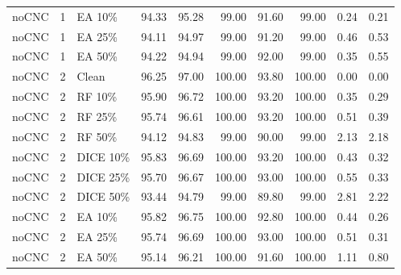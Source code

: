{\begin{longtable}{rllrrrrrrr}
noCNC & 1 & EA 10\% & 94.33 & 95.28 & 99.00 & 91.60 & 99.00 & 0.24 & 0.21 \\
noCNC & 1 & EA 25\% & 94.11 & 94.97 & 99.00 & 91.20 & 99.00 & 0.46 & 0.53 \\
noCNC & 1 & EA 50\% & 94.22 & 94.94 & 99.00 & 92.00 & 99.00 & 0.35 & 0.55 \\
noCNC & 2 & Clean & 96.25 & 97.00 & 100.00 & 93.80 & 100.00 & 0.00 & 0.00 \\
noCNC & 2 & RF 10\% & 95.90 & 96.72 & 100.00 & 93.20 & 100.00 & 0.35 & 0.29 \\
noCNC & 2 & RF 25\% & 95.74 & 96.61 & 100.00 & 93.20 & 100.00 & 0.51 & 0.39 \\
noCNC & 2 & RF 50\% & 94.12 & 94.83 & 99.00 & 90.00 & 99.00 & 2.13 & 2.18 \\
noCNC & 2 & DICE 10\% & 95.83 & 96.69 & 100.00 & 93.20 & 100.00 & 0.43 & 0.32 \\
noCNC & 2 & DICE 25\% & 95.70 & 96.67 & 100.00 & 93.00 & 100.00 & 0.55 & 0.33 \\
noCNC & 2 & DICE 50\% & 93.44 & 94.79 & 99.00 & 89.80 & 99.00 & 2.81 & 2.22 \\
noCNC & 2 & EA 10\% & 95.82 & 96.75 & 100.00 & 92.80 & 100.00 & 0.44 & 0.26 \\
noCNC & 2 & EA 25\% & 95.74 & 96.69 & 100.00 & 93.00 & 100.00 & 0.51 & 0.31 \\
noCNC & 2 & EA 50\% & 95.14 & 96.21 & 100.00 & 91.60 & 100.00 & 1.11 & 0.80 \\
\end{longtable}
}

